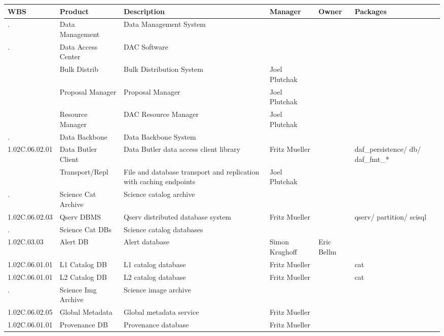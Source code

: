 

\tiny
\begin{longtable}{|p{}|p{}|p{}|p{}|p{}|p{}|}\hline
 \bf WBS & Product & Description & Manager & Owner & Packages\\ \hline
. &  Data Management & Data Management System &  &  & \\ \hline
. &  Data Access Center & DAC Software &  &  & \\ \hline
 &  Bulk Distrib & Bulk Distribution System & Joel Plutchak &  & \\ \hline
 &  Proposal Manager & Proposal Manager & Joel Plutchak &  & \\ \hline
 &  Resource Manager & DAC Resource Manager & Joel Plutchak &  & \\ \hline
. &  Data Backbone & Data Backbone System &  &  & \\ \hline
1.02C.06.02.01 &  Data Butler Client & Data Butler data access client library & Fritz Mueller &  & daf\_persistence/ db/ daf\_fmt\_*\\ \hline
 &  Transport/Repl & File and database transport and replication with caching endpoints & Joel Plutchak &  & \\ \hline
. &  Science Cat Archive & Science catalog archive &  &  & \\ \hline
1.02C.06.02.03 &  Qserv DBMS & Qserv distributed database system & Fritz Mueller &  & qserv/ partition/ scisql\\ \hline
. &  Science Cat DBs & Science catalog databases &  &  & \\ \hline
1.02C.03.03 &  Alert DB & Alert database & Simon Krughoff & Eric Bellm & \\ \hline
1.02C.06.01.01 &  L1 Catalog DB & L1 catalog database & Fritz Mueller &  & cat\\ \hline
1.02C.06.01.01 &  L2 Catalog DB & L2 catalog database & Fritz Mueller &  & cat\\ \hline
. &  Science Img Archive & Science image archive &  &  & \\ \hline
1.02C.06.02.05 &  Global Metadata & Global metadata service & Fritz Mueller &  & \\ \hline
1.02C.06.01.01 &  Provenance DB & Provenance database & Fritz Mueller &  & \\ \hline

\end{longtable}
